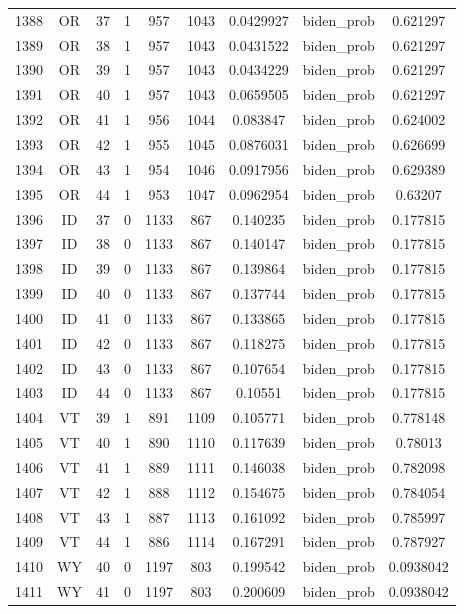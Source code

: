 \documentclass[12pt,a4paper]{article}
\begin{document}
\begin{tabular}{r|cccccccc}
	1388 & OR & 37 & 1 & 957 & 1043 & 0.0429927 & biden\_prob & 0.621297 \\
	1389 & OR & 38 & 1 & 957 & 1043 & 0.0431522 & biden\_prob & 0.621297 \\
	1390 & OR & 39 & 1 & 957 & 1043 & 0.0434229 & biden\_prob & 0.621297 \\
	1391 & OR & 40 & 1 & 957 & 1043 & 0.0659505 & biden\_prob & 0.621297 \\
	1392 & OR & 41 & 1 & 956 & 1044 & 0.083847 & biden\_prob & 0.624002 \\
	1393 & OR & 42 & 1 & 955 & 1045 & 0.0876031 & biden\_prob & 0.626699 \\
	1394 & OR & 43 & 1 & 954 & 1046 & 0.0917956 & biden\_prob & 0.629389 \\
	1395 & OR & 44 & 1 & 953 & 1047 & 0.0962954 & biden\_prob & 0.63207 \\
	1396 & ID & 37 & 0 & 1133 & 867 & 0.140235 & biden\_prob & 0.177815 \\
	1397 & ID & 38 & 0 & 1133 & 867 & 0.140147 & biden\_prob & 0.177815 \\
	1398 & ID & 39 & 0 & 1133 & 867 & 0.139864 & biden\_prob & 0.177815 \\
	1399 & ID & 40 & 0 & 1133 & 867 & 0.137744 & biden\_prob & 0.177815 \\
	1400 & ID & 41 & 0 & 1133 & 867 & 0.133865 & biden\_prob & 0.177815 \\
	1401 & ID & 42 & 0 & 1133 & 867 & 0.118275 & biden\_prob & 0.177815 \\
	1402 & ID & 43 & 0 & 1133 & 867 & 0.107654 & biden\_prob & 0.177815 \\
	1403 & ID & 44 & 0 & 1133 & 867 & 0.10551 & biden\_prob & 0.177815 \\
	1404 & VT & 39 & 1 & 891 & 1109 & 0.105771 & biden\_prob & 0.778148 \\
	1405 & VT & 40 & 1 & 890 & 1110 & 0.117639 & biden\_prob & 0.78013 \\
	1406 & VT & 41 & 1 & 889 & 1111 & 0.146038 & biden\_prob & 0.782098 \\
	1407 & VT & 42 & 1 & 888 & 1112 & 0.154675 & biden\_prob & 0.784054 \\
	1408 & VT & 43 & 1 & 887 & 1113 & 0.161092 & biden\_prob & 0.785997 \\
	1409 & VT & 44 & 1 & 886 & 1114 & 0.167291 & biden\_prob & 0.787927 \\
	1410 & WY & 40 & 0 & 1197 & 803 & 0.199542 & biden\_prob & 0.0938042 \\
	1411 & WY & 41 & 0 & 1197 & 803 & 0.200609 & biden\_prob & 0.0938042 \\

\end{tabular}
\end{document}
